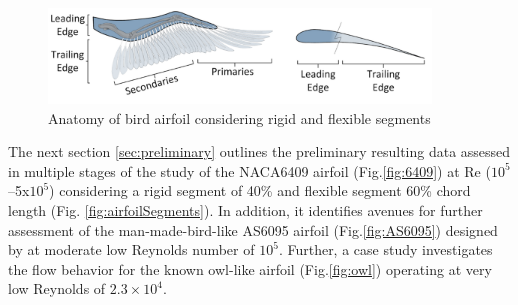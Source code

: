 \begin{figure}[hbt!]
  \centering
\includegraphics[width=4in]{Figures/gamble inman.png}
\caption{\label{fig:segments} Anatomy of bird airfoil considering rigid and flexible segments \cite{Gamble2020a}}
\end{figure}

The next section \ref{sec:preliminary} outlines the preliminary resulting data assessed in multiple stages of the study of the NACA6409 airfoil (Fig.\ref{fig:6409}) at Re ($10^5$–5x$10^5$) considering a rigid segment of 40\% and flexible segment 60\% chord length (Fig. \ref{fig:airfoilSegments}). In addition, it identifies avenues for further assessment of the man-made-bird-like AS6095 airfoil (Fig.\ref{fig:AS6095}) designed by \citet{Ananda2018a} at moderate low Reynolds number of $10^5$. Further,  a case study investigates the flow behavior for the known owl-like airfoil (Fig.\ref{fig:owl}) operating at very low Reynolds of $2.3\times 10^4$.

